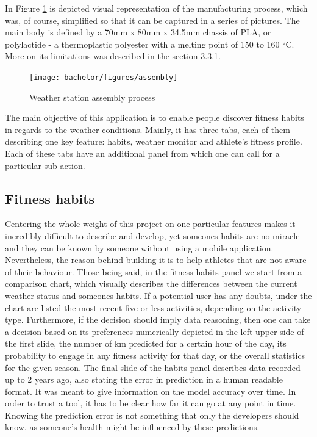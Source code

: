 In Figure \ref{fig:assembly_line} is depicted visual representation of the manufacturing process, which was, of course, simplified so that it can be captured in a series of pictures. The main body is defined by a 70mm x 80mm x 34.5mm chassis of PLA, or polylactide - a thermoplastic polyester with a melting point of 150 to 160 °C. More on its limitations was described in the section 3.3.1.

\begin{figure}[!htb]
    \centering
    \texttt{[image: bachelor/figures/assembly]}
    \caption{Weather station assembly process}
    \label{fig:assembly_line}
\end{figure}

The main objective of this application is to enable people discover fitness habits in regards to the weather conditions. Mainly, it has three tabs, each of them describing one key feature: habits, weather monitor and athlete's fitness profile. Each of these tabs have an additional panel from which one can call for a particular sub-action. 

\subsection{Fitness habits}

Centering the whole weight of this project on one particular features makes it incredibly difficult to describe and develop, yet someones habits are no miracle and they can be known by someone without using a mobile application. Nevertheless, the reason behind building it is to help athletes that are not aware of their behaviour. Those being said, in the fitness habits panel we start from a comparison chart, which visually describes the differences between the current weather status and someones habits. If a potential user has any doubts, under the chart are listed the most recent five or less activities, depending on the activity type. Furthermore, if the decision should imply data reasoning, then one can take a decision based on its preferences numerically depicted in the left upper side of the first slide, the number of km predicted for a certain hour of the day, its probability to engage in any fitness activity for that day, or the overall statistics for the given season. The final slide of the habits panel describes data recorded up to 2 years ago, also stating the error in prediction in a human readable format. It was meant to give information on the model accuracy over time. In order to trust a tool, it has to be clear how far it can go at any point in time. Knowing the prediction error is not something that only the developers should know, as someone's health might be influenced by these predictions.
\vspace{4mm}


